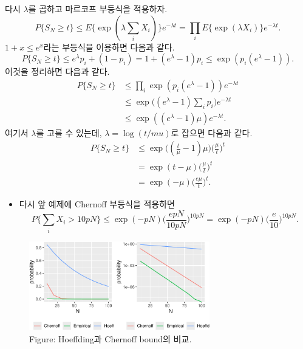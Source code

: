 \documentclass[
  letterpaper,
  DIV=11,
  numbers=noendperiod]{scrreprt}
\providecommand{\tightlist}{%
  \setlength{\itemsep}{0pt}\setlength{\parskip}{0pt}}\usepackage{longtable,booktabs,array}
\theoremstyle{plain}
\theoremstyle{definition}
\theoremstyle{definition}
\theoremstyle{plain}
\theoremstyle{plain}
\theoremstyle{remark}
\begin{document}
\begin{tcolorbox}[enhanced jigsaw, opacityback=0, colframe=quarto-callout-tip-color-frame, breakable, left=2mm, arc=.35mm, rightrule=.15mm, titlerule=0mm, coltitle=black, title=\textcolor{quarto-callout-tip-color}{\faLightbulb}\hspace{0.5em}{Proof}, colbacktitle=quarto-callout-tip-color!10!white, toptitle=1mm, bottomtitle=1mm, leftrule=.75mm, toprule=.15mm, colback=white, opacitybacktitle=0.6, bottomrule=.15mm]

다시 \(\lambda\)를 곱하고 마르코프 부등식을 적용하자. \[
P\{ S_N \geq t \} \leq E\{ \exp (\lambda \sum_{i} X_i) \}e^{-\lambda t} = \prod_i E\{ \exp (\lambda X_i) \}e^{-\lambda t}.
\] \(1+x \leq e^{x}\)라는 부등식을 이용하면 다음과 같다. \[
P\{ S_N \geq t \} \leq  e^{\lambda}p_i + (1-p_i) = 1 + (e^{\lambda} - 1)p_i \leq \exp (p_i (e^\lambda - 1)).
\] 이것을 정리하면 다음과 같다. \[
\begin{align*}
P\{ S_N \geq t \} &\leq \prod_i \exp (p_i (e^\lambda -1))e^{-\lambda t}\\
&\leq \exp \Big( (e^\lambda - 1)\sum_i p_i \Big) e^{-\lambda t}\\
&\leq \exp ((e^{\lambda}-1)\mu) e^{-\lambda t}.
\end{align*}
\] 여기서 \(\lambda\)를 고를 수 있는데, \(\lambda = \log (t/mu)\)로
잡으면 다음과 같다. \[
\begin{align*}
P\{ S_N \geq t \} &\leq \exp \Big( (\frac{t}{\mu}-1)\mu \Big) \Big( \frac{\mu}{t} \Big)^t\\
&= \exp (t-\mu) \Big( \frac{\mu}{t} \Big)^t\\
&=\exp (-\mu) \Big( \frac{e\mu}{t} \Big)^t.
\end{align*}
\]

\end{tcolorbox}

\begin{itemize}
\tightlist
\item
  다시 앞 예제에 Chernoff 부등식을 적용하면 \[
  P \{\sum_i X_i > 10pN \} \leq \exp (-p N) \Big( \frac{epN}{10pN}\Big)^{10pN} = \exp (-p N) \Big( \frac{e}{10}\Big)^{10pN}.
  \]
\end{itemize}

\begin{figure}[H]

{\centering \includegraphics[width=0.7\textwidth,height=\textheight]{ineq_files/figure-pdf/unnamed-chunk-5-1.pdf}

}

\caption{Figure: Hoeffding과 Chernoff bound의 비교.}

\end{figure}%
\end{document}
